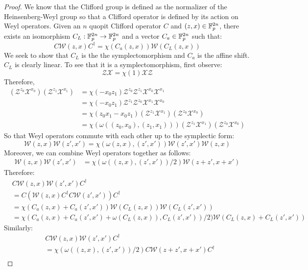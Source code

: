 \begin{proof}
We know that the Clifford group is defined as the normalizer of the Heinsenberg-Weyl group so that a Clifford operator is defined by its action on Weyl operators. Given an $n$ quopit Clifford operator $C$  and $(z,x)\in \mathbb{F}_p^{2n}$, there exists  an isomorphism $C_L:\mathbb{F}_p^{2n}\to \mathbb{F}_p^{2n}$ and a vector  $C_a\in \mathbb{F}_p^{2n}$ such that:
$$
C {\mathcal W}(z,x) C^\dag
=
\chi(C_a(z,x)){\mathcal W}(C_L(z,x))
$$
We seek to show that $C_L$ is the the symplectomorphism and $C_a$ is the affine shift.  $C_L$ is clearly linear.  To see that it is a symplectomorphism, first observe:
$$
\mathcal{Z}\mathcal{X}  = \chi(1)\mathcal{X} \mathcal{Z}
$$
Therefore, 
\begin{align*}
(\mathcal{Z}^{z_0}\mathcal{X}^{x_0})(\mathcal{Z}^{z_1}\mathcal{X}^{x_1} )
&=\chi(-x_0z_1) \mathcal{Z}^{z_0}\mathcal{Z}^{z_1}\mathcal{X}^{x_0}\mathcal{X}^{x_1}  \\
&=\chi(-x_0z_1)\mathcal{Z}^{z_1}  \mathcal{Z}^{z_0}\mathcal{X}^{x_1} \mathcal{X}^{x_0}  \\
&=\chi(z_0x_1-x_0z_1)(\mathcal{Z}^{z_1} \mathcal{X}^{x_1})(  \mathcal{Z}^{z_0}\mathcal{X}^{x_0} ) \\
&=\chi(\omega((z_0,x_0),(z_1,x_1)))(\mathcal{Z}^{z_1} \mathcal{X}^{x_1})(  \mathcal{Z}^{z_0}\mathcal{X}^{x_0} ) 
\end{align*}
So that Weyl operators commute with each other up to the symplectic form:
$$
{\mathcal W}(z,x) {\mathcal W}(z',x') = \chi(\omega(z,x),(z',x')) {\mathcal W}(z',x') {\mathcal W}(z,x) $$
Moreover, we can combine Weyl operators together as follows:
\begin{align*}
{\mathcal W}(z,x) {\mathcal W}(z',x')
&=\chi(\omega((z,x),(z',x'))/2){\mathcal W}(z+z',x+x') 
\end{align*}
Therefore:
\begin{align*}
&C\mathcal{W}(z,x)\mathcal{W}(z',x')C^\dag\\
&=C(\mathcal{W}(z,x) C^\dag C \mathcal{W}(z',x'))C^\dag\\
&=\chi(C_a(z,x)+C_a(z',x')) \mathcal{W}(C_L(z,x))\mathcal{W}(C_L(z',x')) \\
&=\chi(C_a(z,x)+C_a(z',x')+\omega(C_L(z,x)),C_L(z',x'))/2)  \mathcal{W}(C_L(z,x)+C_L(z',x')) 
\end{align*}
Similarly:
\begin{align*}
&C\mathcal{W}(z,x)\mathcal{W}(z',x')C^\dag\\
&= \chi(\omega((z,x),(z',x'))/2) C \mathcal{W}(z+z',x+x') C^\dag\\

\end{align*}
\end{proof}
